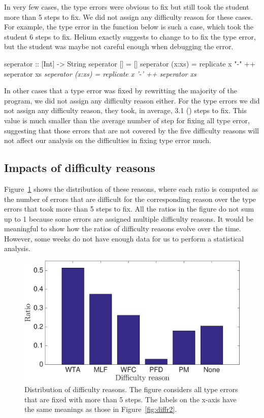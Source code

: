\documentclass[12pt]{report}	%
\begin{document}
In very few cases, the type errors were obvious to fix 
but still took the student more than 5 steps to fix. We did
not assign any difficulty reason for these cases.
%
For example, the type error in the function  below is such a case,
which took
the student 6 steps to fix. 
Helium exactly suggests
to change \progdq{-} to \progsq{-} to fix the type error,
but the student 
was maybe not careful enough when debugging the error.
%
\begin{program}
seperator :: [Int] -> String
seperator [] = []
seperator (x:xs) = replicate x "-" ++ seperator xs
\it{seperator (x:xs) = replicate x '-' ++ seperator xs}
\end{program}
%
In other cases that a type error was fixed by rewritting the majority
of the program, we did not assign any difficulty reason either.
%
%
For the type errors we did not assign any
difficulty reason, they took, in average, 
3.1 () steps to fix. This value is much smaller
than the average number of step for fixing all type error,
suggesting that those errors that are not covered by the five difficulty reasons
will not affect our analysis on the difficulties in fixing type error much.


\subsection{Impacts of difficulty reasons}
\label{sec:diffr:res}

Figure~\ref{fig:diffr1} shows
the distribution of these reasons, where
each ratio is computed as the number of
errors that are difficult
for the corresponding reason over the type errors that took more than
5 steps to fix. All the ratios in the figure do not
sum up to 1 because some errors are assigned multiple
difficulty reasons.
%
It would be meaningful to show how the ratios of
difficulty reasons evolve over the time.
However, 
some weeks do not have enough data for us to perform 
a statistical analysis.

\begin{figure}
\centering
\includegraphics[width=0.85\columnwidth]{images/diffr.eps}
\caption{Distribution of difficulty reasons. The figure considers
all type errors that are fixed with more than 5 steps. The labels on 
the x-axis have the same meanings as those in Figure~\ref{fig:diffr2}.
}
\label{fig:diffr1}
\end{figure}
\end{document}
